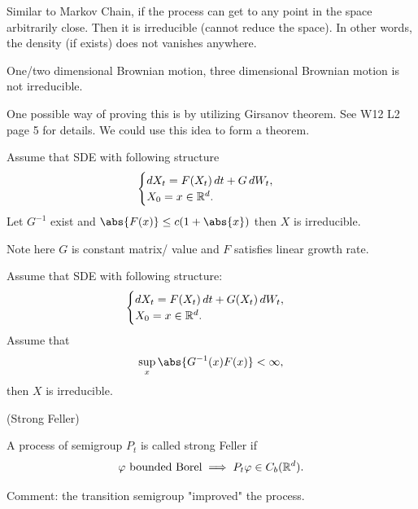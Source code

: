 Similar to Markov Chain, if the process can get to any point in the space arbitrarily close. Then it is irreducible (cannot reduce the space). In other words, the density (if exists) does not vanishes anywhere.

\begin{example}
One/two dimensional Brownian motion, three dimensional Brownian motion is not irreducible. 
\end{example}

One possible way of proving this is by utilizing Girsanov theorem. See W12 L2 page 5 for details. We could use this idea to form a theorem.

\begin{thm}
Assume that SDE with following structure
\begin{equation*}
    \begin{cases}
        \mathop{}\!d X_t = F(X_t) \mathop{}\!d t + G \mathop{}\!d W_t, \\
        X_0 = x \in \mathbb{R}^d.
    \end{cases}
\end{equation*}
Let $G^{-1}$ exist and $\abs{F(x)} \leq c(1+\abs{x})$ then $X$ is irreducible.
\end{thm}

Note here $G$ is constant matrix/ value and $F$ satisfies linear growth rate.
\begin{thm}
Assume that SDE with following structure:
\begin{equation*}
    \begin{cases}
        \mathop{}\!d X_t = F(X_t) \mathop{}\!d t + G(X_t) \mathop{}\!d W_t, \\
        X_0 = x \in \mathbb{R}^d.
    \end{cases}
\end{equation*}
Assume that 
\begin{equation*}
    \sup_{x} \abs{G^{-1}(x)F(x)} <\infty,
\end{equation*}
then $X$ is irreducible.
\end{thm}

\begin{dfn}{(Strong Feller)}\label{dfn: strongfeller}

A process of semigroup $P_t$ is called strong Feller if  
\begin{equation*}
    \varphi \text{ bounded Borel} \implies P_t \varphi \in C_b(\mathbb{R}^d).
\end{equation*}
\end{dfn}
Comment: the transition semigroup "improved" the process.

